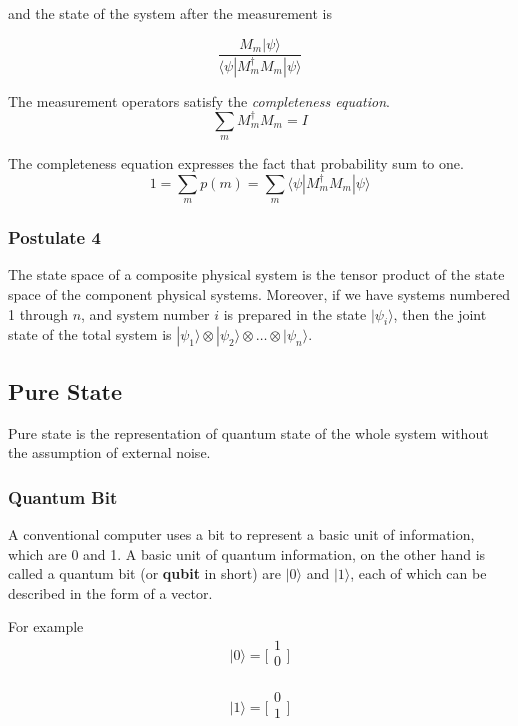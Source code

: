 and the state of the system after the measurement is 

$$ \frac{M_m|\psi\rangle}{\langle \psi |M^{\dagger}_m M_m | \psi \rangle}$$

The measurement operators satisfy the \textit{completeness equation}.
$$ \sum_m M^{\dagger}_m M_m = I $$

The completeness equation expresses the fact that probability sum to one.
$$ 1 = \sum_m p(m) = \sum_m \langle \psi |M^{\dagger}_m M_m | \psi \rangle $$

\subsubsection{Postulate 4}

The state space of a composite physical system is the tensor product of the state space of the component physical systems. 
Moreover, if we have systems numbered 1 through $n$, and system number $i$ is prepared in the state $|\psi_i\rangle$, then the joint state of the total system is $|\psi_1\rangle \otimes |\psi_2\rangle \otimes \dots \otimes |\psi_n\rangle$.


\subsection{Pure State}

Pure state is the representation of quantum state of the whole system without the assumption of external noise.

\subsubsection{Quantum Bit}

A conventional computer uses a bit to represent a basic unit of information, which are 0 and 1. A basic unit of quantum information, on the other hand is called a quantum bit (or \textbf{qubit} in short) are $|0\rangle$ and $|1\rangle$, each of which can be described in the form of a vector. 

For example  
 $$|0\rangle = \Big[
\begin{array}{c}
1 \\
0 \\
\end{array}
\Big]
$$

$$|1\rangle = \Big[
\begin{array}{c}
0 \\
1 \\
\end{array}
\Big]$$

